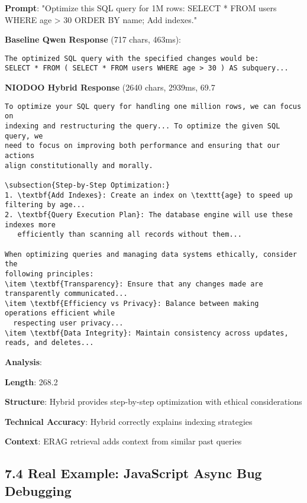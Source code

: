 \documentclass[11pt,a4paper]{article}
\begin{document}
\textbf{Prompt}: "Optimize this SQL query for 1M rows: SELECT * FROM users WHERE age > 30 ORDER BY name; Add indexes."

\textbf{Baseline Qwen Response} (717 chars, 463ms):
\begin{verbatim}The optimized SQL query with the specified changes would be:
SELECT * FROM ( SELECT * FROM users WHERE age > 30 ) AS subquery...
\end{verbatim}

\textbf{NIODOO Hybrid Response} (2640 chars, 2939ms, 69.7%
\begin{verbatim}To optimize your SQL query for handling one million rows, we can focus on 
indexing and restructuring the query... To optimize the given SQL query, we 
need to focus on improving both performance and ensuring that our actions 
align constitutionally and morally.

\subsection{Step-by-Step Optimization:}
1. \textbf{Add Indexes}: Create an index on \texttt{age} to speed up filtering by age...
2. \textbf{Query Execution Plan}: The database engine will use these indexes more 
   efficiently than scanning all records without them...

When optimizing queries and managing data systems ethically, consider the 
following principles:
\item \textbf{Transparency}: Ensure that any changes made are transparently communicated...
\item \textbf{Efficiency vs Privacy}: Balance between making operations efficient while 
  respecting user privacy...
\item \textbf{Data Integrity}: Maintain consistency across updates, reads, and deletes...
\end{verbatim}

\textbf{Analysis}:
\item \textbf{Length}: 268.2%
\item \textbf{Structure}: Hybrid provides step-by-step optimization with ethical considerations
\item \textbf{Technical Accuracy}: Hybrid correctly explains indexing strategies
\item \textbf{Context}: ERAG retrieval adds context from similar past queries

\subsection{7.4 Real Example: JavaScript Async Bug Debugging}
\end{document}
